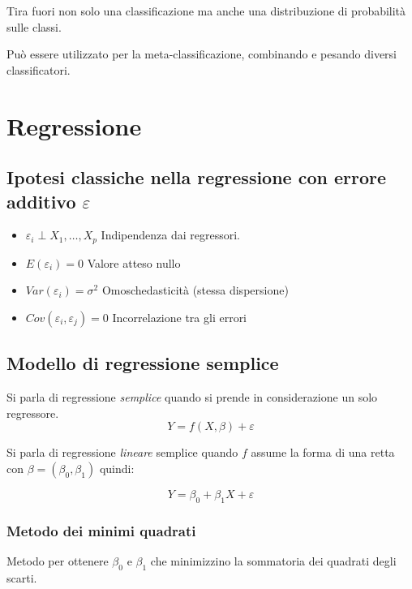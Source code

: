 \documentclass[11pt,onecolumn,a4paper,oneside]{book}
\begin{document}
Tira fuori non solo una classificazione ma anche una distribuzione di probabilità sulle classi.

Può essere utilizzato per la meta-classificazione, combinando e pesando diversi classificatori.


\chapter{Regressione}

\section{Ipotesi classiche nella regressione con errore additivo $\varepsilon$}
\label{ipotesi}

\begin{itemize}

\item $\varepsilon_i \perp X_1, \dots, X_p$ \hspace{.5cm} Indipendenza dai regressori.

\item $E(\varepsilon_i) = 0$ \hspace{1.5cm} Valore atteso nullo

\item $Var(\varepsilon_i) = \sigma^2$ \hspace{.9cm} Omoschedasticità (stessa dispersione)

\item $Cov(\varepsilon_i, \varepsilon_j ) = 0$  \hspace{.7cm} Incorrelazione tra gli errori
\end{itemize}

\section{Modello di regressione semplice}
Si parla di regressione \emph{semplice} quando si prende in considerazione un solo regressore.
$$Y= f \left( X, \beta \right) + \varepsilon$$

Si parla di regressione \emph{lineare} semplice quando $f$ assume la forma di una retta con $\beta = ( \beta_0, \beta_1 ) $ quindi:

$$Y = \beta_0 + \beta_1 X + \varepsilon$$

\subsection{Metodo dei minimi quadrati}
Metodo per ottenere $\beta_0$ e $\beta_1$ che minimizzino la sommatoria dei quadrati degli scarti.
\end{document}
